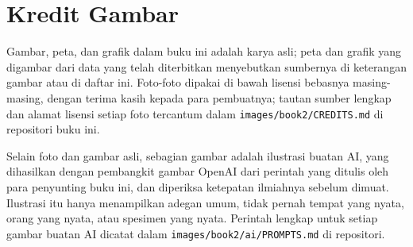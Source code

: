 \chapter*{Kredit Gambar}

Gambar, peta, dan grafik dalam buku ini adalah karya asli; peta dan grafik
yang digambar dari data yang telah diterbitkan menyebutkan sumbernya di
keterangan gambar atau di daftar ini. Foto-foto dipakai di bawah lisensi
bebasnya masing-masing, dengan terima kasih kepada para pembuatnya; tautan
sumber lengkap dan alamat lisensi setiap foto tercantum dalam
\texttt{images/book2/CREDITS.md} di repositori buku ini.

\bigskip
Selain foto dan gambar asli, sebagian gambar adalah ilustrasi buatan AI,
yang dihasilkan dengan pembangkit gambar OpenAI dari perintah yang ditulis
oleh para penyunting buku ini, dan diperiksa ketepatan ilmiahnya sebelum
dimuat. Ilustrasi itu hanya menampilkan adegan umum, tidak pernah tempat
yang nyata, orang yang nyata, atau spesimen yang nyata. Perintah lengkap
untuk setiap gambar buatan AI dicatat dalam
\texttt{images/book2/ai/PROMPTS.md} di repositori.

